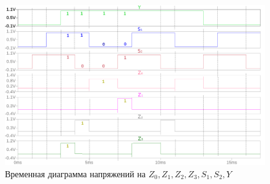 \begin{figure}[H]
	\centering
	\includegraphics[width=1\textwidth]{../data/test_boe_time}
	\caption{Временная диаграмма напряжений на $Z_0, Z_1, Z_2, Z_3, S_1, S_2, Y$}
\end{figure}
